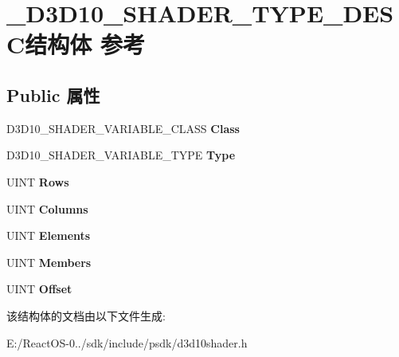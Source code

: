 \hypertarget{struct___d3_d10___s_h_a_d_e_r___t_y_p_e___d_e_s_c}{}\section{\+\_\+\+D3\+D10\+\_\+\+S\+H\+A\+D\+E\+R\+\_\+\+T\+Y\+P\+E\+\_\+\+D\+E\+S\+C结构体 参考}
\label{struct___d3_d10___s_h_a_d_e_r___t_y_p_e___d_e_s_c}
\subsection*{Public 属性}
\begin{DoxyCompactItemize}
\item 
\mbox{\label{struct___d3_d10___s_h_a_d_e_r___t_y_p_e___d_e_s_c_a3b32daee43ffdcd8d4b5bdbdfee6a9aa}} 
D3\+D10\+\_\+\+S\+H\+A\+D\+E\+R\+\_\+\+V\+A\+R\+I\+A\+B\+L\+E\+\_\+\+C\+L\+A\+SS {\bfseries Class}
\item 
\mbox{\label{struct___d3_d10___s_h_a_d_e_r___t_y_p_e___d_e_s_c_a2c89538b2d25b9486cf0633fa258d5ea}} 
D3\+D10\+\_\+\+S\+H\+A\+D\+E\+R\+\_\+\+V\+A\+R\+I\+A\+B\+L\+E\+\_\+\+T\+Y\+PE {\bfseries Type}
\item 
\mbox{\label{struct___d3_d10___s_h_a_d_e_r___t_y_p_e___d_e_s_c_a190a735ce547c61d40b923d2badb564e}} 
U\+I\+NT {\bfseries Rows}
\item 
\mbox{\label{struct___d3_d10___s_h_a_d_e_r___t_y_p_e___d_e_s_c_ad78861814a87e20f483524ae646e8cd6}} 
U\+I\+NT {\bfseries Columns}
\item 
\mbox{\label{struct___d3_d10___s_h_a_d_e_r___t_y_p_e___d_e_s_c_a4c50b6f7603476ea9a685d26fda74479}} 
U\+I\+NT {\bfseries Elements}
\item 
\mbox{\label{struct___d3_d10___s_h_a_d_e_r___t_y_p_e___d_e_s_c_a9283ee2ea52f9dad2b65ac97e5a4b55e}} 
U\+I\+NT {\bfseries Members}
\item 
\mbox{\label{struct___d3_d10___s_h_a_d_e_r___t_y_p_e___d_e_s_c_ac5dd91d6961097f3681df09ee5f025f9}} 
U\+I\+NT {\bfseries Offset}
\end{DoxyCompactItemize}


该结构体的文档由以下文件生成\+:\begin{DoxyCompactItemize}
\item 
E\+:/\+React\+O\+S-\/0../sdk/include/psdk/d3d10shader.\+h\end{DoxyCompactItemize}
